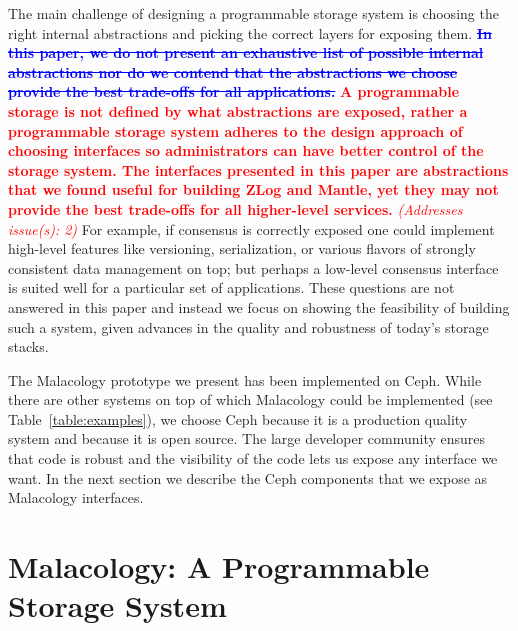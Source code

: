 \documentclass[preprint]{sigplanconf-eurosys}
\newcommand{\newcomment}[1]{{\textcolor{red}{\textbf{#1}}}}
\newcommand{\oldcomment}[1]{{\textcolor{blue}{\textbf{\sout{#1}}}}}
\newcommand{\addressesissue}[1]{{\textcolor{red}{{\it (Addresses issue(s): {#1})}}}}
\begin{document}
The main challenge of designing a programmable storage system is choosing the
right internal abstractions and picking the correct layers for exposing them.
\oldcomment{In this paper, we do not present an exhaustive list of possible
internal abstractions nor do we contend that the abstractions we choose provide
the best trade-offs for all applications.} 
\newcomment{A programmable storage is not defined by what abstractions are
exposed, rather a programmable storage system adheres to the design approach of
choosing interfaces so administrators can have better control of the storage
system. The interfaces presented in this paper are abstractions that we found
useful for building ZLog and Mantle, yet they may not provide the best
trade-offs for all higher-level services.}
\addressesissue{2}
For example, if consensus is correctly exposed one could implement
high-level features like versioning, serialization, or various flavors of
strongly consistent data management on top; but perhaps a low-level consensus
interface is suited well for a particular set of applications.  These questions
are not answered in this paper and instead we focus on showing the feasibility
of building such a system, given advances in the quality and robustness of
today's storage stacks.

The Malacology prototype we present has been implemented on Ceph.
While there are other systems on top of which Malacology could be implemented (see Table~\ref{table:examples}), we choose Ceph because it is a production quality system and because it
is open source. The large developer community ensures that code is
robust and the visibility of the code lets us expose any interface we want. In
the next section we describe the Ceph components that we expose as Malacology
interfaces.

\section{Malacology: A Programmable Storage System}
\label{sec:malacology}
\end{document}
